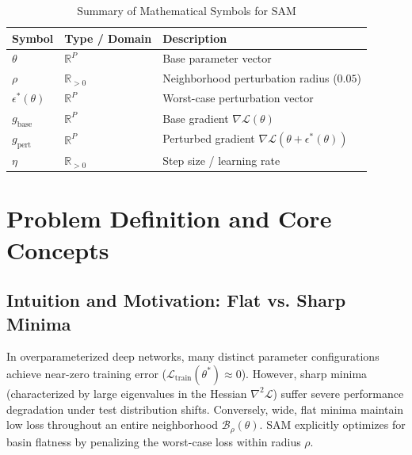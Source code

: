 \documentclass[11pt,a4paper]{article}
\theoremstyle{definition}
\begin{document}
\begin{table}[h]
\centering
\caption{Summary of Mathematical Symbols for SAM}
\begin{tabular}{lll}
\toprule
\textbf{Symbol} & \textbf{Type / Domain} & \textbf{Description} \\
\midrule
$\theta$ & $\mathbb{R}^P$ & Base parameter vector \\
$\rho$ & $\mathbb{R}_{> 0}$ & Neighborhood perturbation radius ($0.05$) \\
$\epsilon^*(\theta)$ & $\mathbb{R}^P$ & Worst-case perturbation vector \\
$g_{\text{base}}$ & $\mathbb{R}^P$ & Base gradient $\nabla \mathcal{L}(\theta)$ \\
$g_{\text{pert}}$ & $\mathbb{R}^P$ & Perturbed gradient $\nabla \mathcal{L}(\theta + \epsilon^*(\theta))$ \\
$\eta$ & $\mathbb{R}_{> 0}$ & Step size / learning rate \\
\bottomrule
\end{tabular}
\end{table}

\section{Problem Definition and Core Concepts}

\subsection{Intuition and Motivation: Flat vs. Sharp Minima}
In overparameterized deep networks, many distinct parameter configurations achieve near-zero training error ($\mathcal{L}_{\text{train}}(\theta^*) \approx 0$). However, sharp minima (characterized by large eigenvalues in the Hessian $\nabla^2 \mathcal{L}$) suffer severe performance degradation under test distribution shifts. Conversely, wide, flat minima maintain low loss throughout an entire neighborhood $\mathcal{B}_\rho(\theta)$. SAM explicitly optimizes for basin flatness by penalizing the worst-case loss within radius $\rho$.
\end{document}
